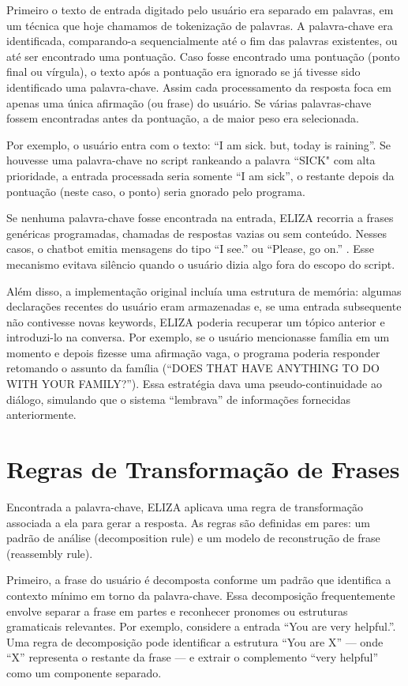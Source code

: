 \documentclass[14pt,a4paper,oneside]{book}
\begin{document}
Primeiro o texto de entrada digitado pelo usuário era separado em palavras, em um técnica que hoje chamamos de tokenização de palavras. A palavra-chave era identificada, comparando-a sequencialmente até o fim das palavras existentes, ou até ser encontrado uma pontuação. Caso fosse encontrado uma pontuação (ponto final ou vírgula), o texto após a pontuação era ignorado se já tivesse sido identificado uma palavra-chave. Assim cada processamento da resposta foca em apenas uma única afirmação (ou frase) do usuário. Se várias palavras-chave fossem encontradas antes da pontuação, a de maior peso era selecionada.

Por exemplo, o usuário entra com o texto: “I am sick. but, today is raining”. Se houvesse uma palavra-chave no script rankeando a palavra “SICK" com alta prioridade, a entrada processada seria somente “I am sick”, o restante depois da pontuação (neste caso, o ponto) seria gnorado pelo programa.

Se nenhuma palavra-chave fosse encontrada na entrada, ELIZA recorria a frases genéricas programadas, chamadas de respostas vazias ou sem conteúdo. Nesses casos, o chatbot emitia mensagens do tipo “I see.” ou “Please, go on.” . Esse mecanismo evitava silêncio quando o usuário dizia algo fora do escopo do script.

Além disso, a implementação original incluía uma estrutura de memória: algumas declarações recentes do usuário eram armazenadas e, se uma entrada subsequente não contivesse novas keywords, ELIZA poderia recuperar um tópico anterior e introduzi-lo na conversa.
Por exemplo, se o usuário mencionasse família em um momento e depois fizesse uma afirmação vaga, o programa poderia responder retomando o assunto da família (“DOES THAT HAVE ANYTHING TO DO WITH YOUR FAMILY?”).
Essa estratégia dava uma pseudo-continuidade ao diálogo, simulando que o sistema “lembrava” de informações fornecidas anteriormente.

\section{Regras de Transformação de Frases}

Encontrada a palavra-chave, ELIZA aplicava uma regra de transformação associada a ela para gerar a resposta. As regras são definidas em pares: um padrão de análise (decomposition rule) e um modelo de reconstrução de frase (reassembly rule).

Primeiro, a frase do usuário é decomposta conforme um padrão que identifica a contexto mínimo em torno da palavra-chave. Essa decomposição frequentemente envolve separar a frase em partes e reconhecer pronomes ou estruturas gramaticais relevantes. Por exemplo, considere a entrada “You are very helpful.”. Uma regra de decomposição pode identificar a estrutura “You are X” — onde “X” representa o restante da frase — e extrair o complemento “very helpful” como um componente separado.
\end{document}
